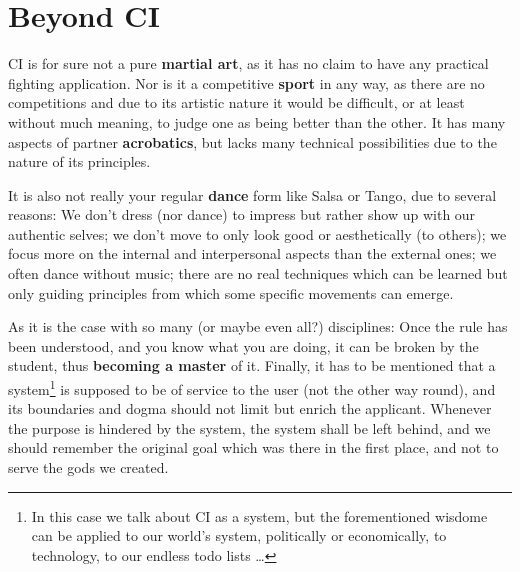 \section{Beyond CI}\label{sec:beyond-ci}

CI is for sure not a pure \textbf{martial art}, as it has no claim to have any practical fighting application.
Nor is it a competitive \textbf{sport} in any way, as there are no competitions and due to its artistic nature it would be difficult, or at least without much meaning, to judge one as being better than the other.
It has many aspects of partner \textbf{acrobatics}, but lacks many technical possibilities due to the nature of its principles.

It is also not really your regular \textbf{dance} form like Salsa or Tango, due to several reasons: We don't dress (nor dance) to impress but rather show up with our authentic selves; we don't move to only look good or aesthetically (to others); we focus more on the internal and interpersonal aspects than the external ones; we often dance without music; there are no real techniques which can be learned but only guiding principles from which some specific movements can emerge.

As it is the case with so many (or maybe even all?) disciplines: Once the rule has been understood, and you know what you are doing, it can be broken by the student, thus \textbf{becoming a master} of it.
Finally, it has to be mentioned that a system\footnote{In this case we talk about CI as a system, but the forementioned wisdome can be applied to our world's system, politically or economically, to technology, to our endless todo lists \ldots} is supposed to be of service to the user (not the other way round), and its boundaries and dogma should not limit but enrich the applicant.
Whenever the purpose is hindered by the system, the system shall be left behind, and we should remember the original goal which was there in the first place, and not to serve the gods we created.
